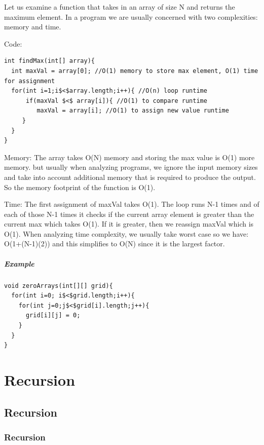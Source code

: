 \documentclass[11pt,oneside]{book}
\begin{document}
Let us examine a function that takes in an array of size N and returns the maximum element. In a program we are usually concerned with two complexities: memory and time.

Code:

\begin{lstlisting}
int findMax(int[] array){
  int maxVal = array[0]; //O(1) memory to store max element, O(1) time for assignment
  for(int i=1;i$<$array.length;i++){ //O(n) loop runtime
      if(maxVal $<$ array[i]){ //O(1) to compare runtime
         maxVal = array[i]; //O(1) to assign new value runtime
     }
  }
}
\end{lstlisting}

Memory: The array takes O(N) memory and storing the max value is O(1) more memory. but usually when analyzing programs, we ignore the input memory sizes and take into account additional memory that is required to produce the output. So the memory footprint of the function is O(1).

Time: The first assignment of maxVal takes O(1). The loop runs N-1 times and of each of those N-1 times it checks if the current array element is greater than the current max which takes O(1). If it is greater, then we reassign maxVal which is O(1). When analyzing time complexity, we usually take worst case so we have: O(1+(N-1)(2)) and this simplifies to O(N) since it is the largest factor.

\subsubsection{Example}

\begin{lstlisting}
void zeroArrays(int[][] grid){
  for(int i=0; i$<$grid.length;i++){
    for(int j=0;j$<$grid[i].length;j++){
      grid[i][j] = 0;
    }
  }
}
\end{lstlisting}

\part{ Recursion }
    \chapter{ Recursion }
        \section{ Recursion }
        
\end{document}
